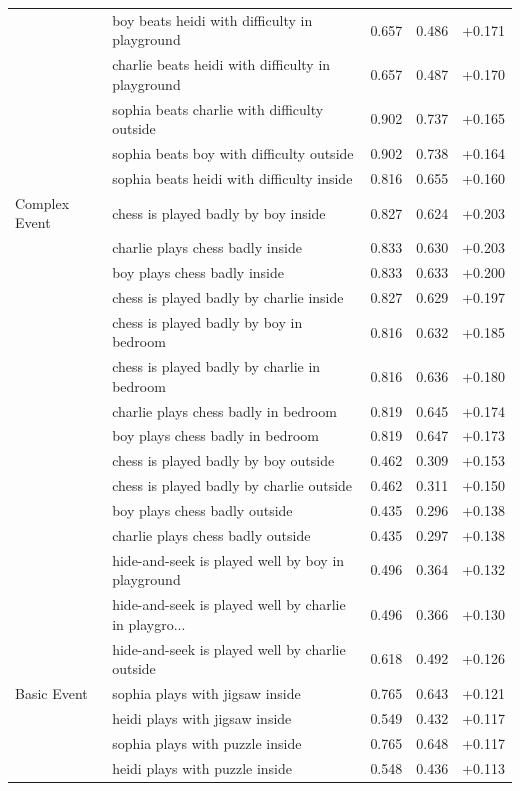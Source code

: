 \begin{longtable}{@{}llrrr@{}}
 & boy beats heidi with difficulty in playground & 0.657 & 0.486 & +0.171 \\
 & charlie beats heidi with difficulty in playground & 0.657 & 0.487 & +0.170 \\
 & sophia beats charlie with difficulty outside & 0.902 & 0.737 & +0.165 \\
 & sophia beats boy with difficulty outside & 0.902 & 0.738 & +0.164 \\
 & sophia beats heidi with difficulty inside & 0.816 & 0.655 & +0.160 \\
\addlinespace
Complex Event & chess is played badly by boy inside & 0.827 & 0.624 & +0.203 \\
 & charlie plays chess badly inside & 0.833 & 0.630 & +0.203 \\
 & boy plays chess badly inside & 0.833 & 0.633 & +0.200 \\
 & chess is played badly by charlie inside & 0.827 & 0.629 & +0.197 \\
 & chess is played badly by boy in bedroom & 0.816 & 0.632 & +0.185 \\
 & chess is played badly by charlie in bedroom & 0.816 & 0.636 & +0.180 \\
 & charlie plays chess badly in bedroom & 0.819 & 0.645 & +0.174 \\
 & boy plays chess badly in bedroom & 0.819 & 0.647 & +0.173 \\
 & chess is played badly by boy outside & 0.462 & 0.309 & +0.153 \\
 & chess is played badly by charlie outside & 0.462 & 0.311 & +0.150 \\
 & boy plays chess badly outside & 0.435 & 0.296 & +0.138 \\
 & charlie plays chess badly outside & 0.435 & 0.297 & +0.138 \\
 & hide-and-seek is played well by boy in playground & 0.496 & 0.364 & +0.132 \\
 & hide-and-seek is played well by charlie in playgro... & 0.496 & 0.366 & +0.130 \\
 & hide-and-seek is played well by charlie outside & 0.618 & 0.492 & +0.126 \\
\addlinespace
Basic Event & sophia plays with jigsaw inside & 0.765 & 0.643 & +0.121 \\
 & heidi plays with jigsaw inside & 0.549 & 0.432 & +0.117 \\
 & sophia plays with puzzle inside & 0.765 & 0.648 & +0.117 \\
 & heidi plays with puzzle inside & 0.548 & 0.436 & +0.113 \\

\end{longtable}
